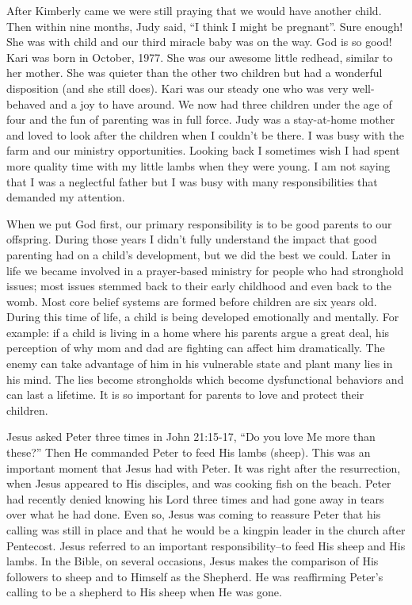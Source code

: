 \documentclass[twoside, 12pt]{book}
\begin{document}
After Kimberly came we were still praying that we would have another child. Then within nine months, Judy said, “I think I might be pregnant”. Sure enough! She was with child and our third miracle baby was on the way. God is so good! Kari was born in October, 1977. She was our awesome little redhead, similar to her mother. She was quieter than the other two children but had a wonderful disposition (and she still does). Kari was our steady one who was very well-behaved and a joy to have around. We now had three children under the age of four and the fun of parenting was in full force. Judy was a stay-at-home mother and loved to look after the children when I couldn't be there. I was busy with the farm and our ministry opportunities. Looking back I sometimes wish I had spent more quality time with my little lambs when they were young. I am not saying that I was a neglectful father but I was busy with many responsibilities that demanded my attention.

When we put God first, our primary responsibility is to be good parents to our offspring. During those years I didn't fully understand the impact that good parenting had on a child's development, but we did the best we could. Later in life we became involved in a prayer-based ministry for people who had stronghold issues; most issues stemmed back to their early childhood and even back to the womb. Most core belief systems are formed before children are six years old. During this time of life, a child is being developed emotionally and mentally. For example: if a child is living in a home where his parents argue a great deal, his perception of why mom and dad are fighting can affect him dramatically. The enemy can take advantage of him in his vulnerable state and plant many lies in his mind. The lies become strongholds which become dysfunctional behaviors and can last a lifetime. It is so important for parents to love and protect their children.

Jesus asked Peter three times in John 21:15-17, “Do you love Me more than these?” Then He commanded Peter to feed His lambs (sheep). This was an important moment that Jesus had with Peter. It was right after the resurrection, when Jesus appeared to His disciples, and was cooking fish on the beach. Peter had recently denied knowing his Lord three times and had gone away in tears over what he had done. Even so, Jesus was coming to reassure Peter that his calling was still in place and that he would be a kingpin leader in the church after Pentecost. Jesus referred to an important responsibility--to feed His sheep and His lambs. In the Bible, on several occasions, Jesus makes the comparison of His followers to sheep and to Himself as the Shepherd. He was reaffirming Peter’s calling to be a shepherd to His sheep when He was gone.
\end{document}
